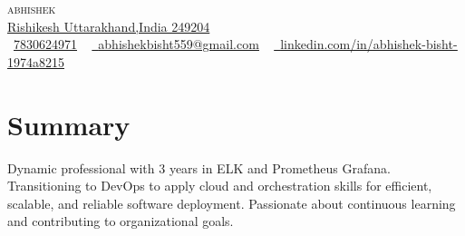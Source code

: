 \documentclass[letterpaper,11pt]{article}
\begin{document}
\begin{center}
    {\Huge \scshape abhishek} \\ \vspace{1pt}
    \underline{Rishikesh Uttarakhand,India 249204} \\ \vspace{1pt}
    \small \raisebox{-0.1\height}\faPhone\ \underline{7830624971} ~ \href{mailto:abhishekbisht559@gmail.com}{\raisebox{-0.2\height}\faEnvelope\  \underline{abhishekbisht559@gmail.com}} ~ 
    \href{linkedin.com/in/abhishek-bisht-1974a8215}{\raisebox{-0.2\height}\faLinkedin\ \underline{linkedin.com/in/abhishek-bisht-1974a8215}}
    \vspace{-8pt}
\end{center}

\section{Summary}
 \begin{itemize}[leftmargin=0.15in, label={}]
    \small{\item{
     {Dynamic professional with 3 years in ELK and  Prometheus Grafana. Transitioning to DevOps to apply cloud and orchestration skills for efficient, scalable, and reliable software deployment. Passionate about continuous learning and contributing to organizational goals.} \\
    }}
 \end{itemize}
 \vspace{-16pt}

\end{document}
